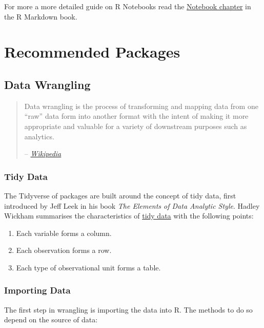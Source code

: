 \documentclass[]{book}
\providecommand{\tightlist}{%
  \setlength{\itemsep}{0pt}\setlength{\parskip}{0pt}}
\begin{document}
For more a more detailed guide on R Notebooks read the
\href{https://bookdown.org/yihui/rmarkdown/notebook.html}{Notebook chapter} in the R Markdown book.

\hypertarget{packages}{%
\chapter{Recommended Packages}\label{packages}}

\hypertarget{data-wrangling}{%
\section{Data Wrangling}\label{data-wrangling}}

\begin{quote}
Data wrangling is the process of transforming and mapping data from one ``raw'' data form
into another format with the intent of making it more appropriate and valuable for a
variety of downstream purposes such as analytics.

-- \href{https://en.wikipedia.org/wiki/Data_wrangling}{\emph{Wikipedia}}
\end{quote}

\hypertarget{tidy-data}{%
\subsection{Tidy Data}\label{tidy-data}}

The Tidyverse of packages are built around the concept of tidy data, first introduced by
Jeff Leek in his book \emph{The Elements of Data Analytic Style}. Hadley Wickham summarises the
characteristics of \href{http://tidyr.tidyverse.org/articles/tidy-data.html}{tidy data} with
the following points:

\begin{enumerate}
\def\labelenumi{\arabic{enumi}.}
\tightlist
\item
  Each variable forms a column.
\item
  Each observation forms a row.
\item
  Each type of observational unit forms a table.
\end{enumerate}

\hypertarget{importing-data}{%
\subsection{Importing Data}\label{importing-data}}

The first step in wrangling is importing the data into R. The methods to do so depend on the
source of data:
\end{document}
